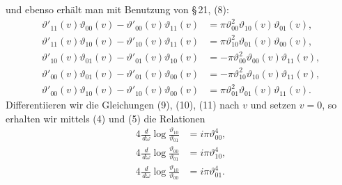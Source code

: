 \documentclass[11pt]{article}
\providecommand{\dd}{\,d}
\providecommand{\tht}{\vartheta}
\begin{document}
und ebenso erhält man mit Benutzung von \S\,21, (8):
\begin{align}
\tht'_{11}(v)\tht_{00}(v)-\tht'_{00}(v)\tht_{11}(v)&=\pi\tht_{00}^{2}\tht_{10}(v)\tht_{01}(v), \tag{7}\\
\tht'_{11}(v)\tht_{10}(v)-\tht'_{10}(v)\tht_{11}(v)&=\pi\tht_{10}^{2}\tht_{01}(v)\tht_{00}(v), \tag{8}\\
\tht'_{10}(v)\tht_{01}(v)-\tht'_{01}(v)\tht_{10}(v)&=-\pi\tht_{00}^{2}\tht_{00}(v)\tht_{11}(v), \tag{9}\\
\tht'_{00}(v)\tht_{01}(v)-\tht'_{01}(v)\tht_{00}(v)&=-\pi\tht_{10}^{2}\tht_{10}(v)\tht_{11}(v), \tag{10}\\
\tht'_{00}(v)\tht_{10}(v)-\tht'_{10}(v)\tht_{00}(v)&=\pi\tht_{01}^{2}\tht_{01}(v)\tht_{11}(v). \tag{11}
\end{align}
Differentiieren wir die Gleichungen (9), (10), (11) nach $v$ und setzen $v=0$, so erhalten wir mittels (4) und (5) die Relationen
\begin{align}
4\frac{\dd}{\dd\omega}\log\frac{\tht_{10}}{\tht_{01}}&=i\pi\tht_{00}^{4}, \tag{12}\\
4\frac{\dd}{\dd\omega}\log\frac{\tht_{00}}{\tht_{01}}&=i\pi\tht_{10}^{4}, \tag{13}\\
4\frac{\dd}{\dd\omega}\log\frac{\tht_{10}}{\tht_{00}}&=i\pi\tht_{01}^{4}. \tag{14}
\end{align}
\end{document}
